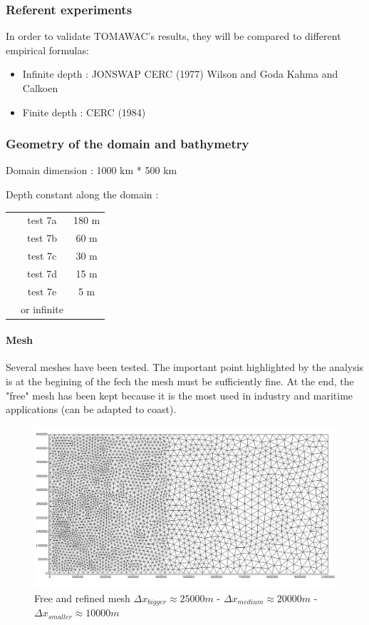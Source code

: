 \subsubsection{Referent experiments}
In order to validate TOMAWAC's results, they will be compared to different empirical formulas:
\begin{itemize}
\item Infinite depth :
\subitem JONSWAP \cite{haselmann1}
\subitem CERC (1977) \cite{CERC77}
\subitem Wilson and Goda \cite{wilson65}
\subitem Kahma and Calkoen \cite{kahma}
\item Finite depth :
\subitem CERC (1984)\cite{CERC84}
\end{itemize}
\subsubsection{Geometry of the domain and bathymetry}
Domain  dimension : 1000 km * 500 km

Depth constant along the domain :

\begin{tabular}{ccc}
 & test 7a & 180 m\\
 & test 7b & 60 m\\
& test 7c & 30 m\\
& test 7d & 15 m\\
& test 7e & 5 m\\
 & or infinite\\
\end{tabular}
\paragraph{Mesh}
Several meshes have been tested. The important point highlighted by the analysis is at the begining of the fech the mesh must be sufficiently fine. At the end, the "free" mesh has been kept because it is the most used in industry and maritime applications (can be adapted to coast).
\begin{figure}[H]
\centering
\includegraphics[scale = 0.35]{freemesh.png}
\caption{Free and refined mesh $\Delta x_{bigger} \approx 25 000 m$ - $\Delta x_{medium} \approx 20 000 m$ - $\Delta x_{smaller} \approx 10 000 m$}
\label{meshfet}
\end{figure}

